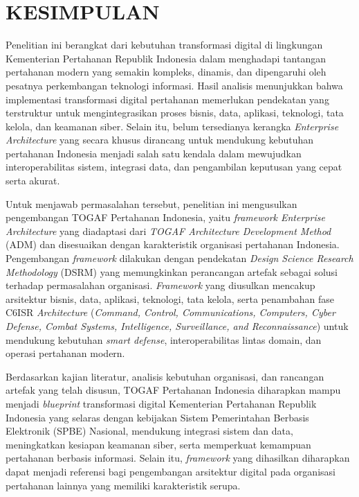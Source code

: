 \cleardoublepage
\chapter{KESIMPULAN}
\label{chap:kesimpulan}

Penelitian ini berangkat dari kebutuhan transformasi digital di lingkungan Kementerian Pertahanan Republik Indonesia dalam menghadapi tantangan pertahanan modern yang semakin kompleks, dinamis, dan dipengaruhi oleh pesatnya perkembangan teknologi informasi.
Hasil analisis menunjukkan bahwa implementasi transformasi digital pertahanan memerlukan pendekatan yang terstruktur untuk mengintegrasikan proses bisnis, data, aplikasi, teknologi, tata kelola, dan keamanan siber.
Selain itu, belum tersedianya kerangka \textit{Enterprise Architecture} yang secara khusus dirancang untuk mendukung kebutuhan pertahanan Indonesia menjadi salah satu kendala dalam mewujudkan interoperabilitas sistem, integrasi data, dan pengambilan keputusan yang cepat serta akurat.

Untuk menjawab permasalahan tersebut, penelitian ini mengusulkan pengembangan TOGAF Pertahanan Indonesia, yaitu \textit{framework Enterprise Architecture} yang diadaptasi dari \textit{TOGAF Architecture Development Method} (ADM) dan disesuaikan dengan karakteristik organisasi pertahanan Indonesia.
Pengembangan \textit{framework} dilakukan dengan pendekatan \textit{Design Science Research Methodology} (DSRM) yang memungkinkan perancangan artefak sebagai solusi terhadap permasalahan organisasi.
\textit{Framework} yang diusulkan mencakup arsitektur bisnis, data, aplikasi, teknologi, tata kelola, serta penambahan fase C6ISR \textit{Architecture} (\textit{Command, Control, Communications, Computers, Cyber Defense, Combat Systems, Intelligence, Surveillance, and Reconnaissance}) untuk mendukung kebutuhan \textit{smart defense}, interoperabilitas lintas domain, dan operasi pertahanan modern.

Berdasarkan kajian literatur, analisis kebutuhan organisasi, dan rancangan artefak yang telah disusun, TOGAF Pertahanan Indonesia diharapkan mampu menjadi \textit{blueprint} transformasi digital Kementerian Pertahanan Republik Indonesia yang selaras dengan kebijakan Sistem Pemerintahan Berbasis Elektronik (SPBE) Nasional, mendukung integrasi sistem dan data, meningkatkan kesiapan keamanan siber, serta memperkuat kemampuan pertahanan berbasis informasi.
Selain itu, \textit{framework} yang dihasilkan diharapkan dapat menjadi referensi bagi pengembangan arsitektur digital pada organisasi pertahanan lainnya yang memiliki karakteristik serupa.

